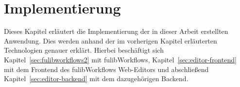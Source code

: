 \chapter{Implementierung}\label{ch:implementierung}
Dieses Kapitel erläutert die Implementierung der in dieser Arbeit erstellten Anwendung.
Dies werden anhand der im vorherigen Kapitel erläuterten Technologien genauer erklärt.
Hierbei beschäftigt sich Kapitel~\ref{sec:fulibworkflows2} mit fulibWorkflows, Kapitel~\ref{sec:editor-frontend} mit dem Frontend des
fulibWorkflows Web-Editors und abschließend Kapitel~\ref{sec:editor-backend} mit dem dazugehörigen Backend.






